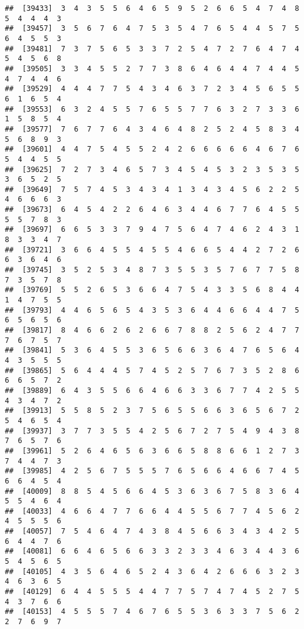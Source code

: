 \documentclass[
]{book}
\begin{document}
\begin{verbatim}
##  [39433]  3  4  3  5  5  6  4  6  5  9  5  2  6  6  5  4  7  4  8  5  4  4  4  3
##  [39457]  3  5  6  7  6  4  7  5  3  5  4  7  6  5  4  4  5  7  5  6  4  5  5  3
##  [39481]  7  3  7  5  6  5  3  3  7  2  5  4  7  2  7  6  4  7  4  5  4  5  6  8
##  [39505]  3  3  4  5  5  2  7  7  3  8  6  4  6  4  4  7  4  4  5  4  7  4  4  6
##  [39529]  4  4  4  7  7  5  4  3  4  6  3  7  2  3  4  5  6  5  5  6  1  6  5  4
##  [39553]  6  3  2  4  5  5  7  6  5  5  7  7  6  3  2  7  3  3  6  1  5  8  5  4
##  [39577]  7  6  7  7  6  4  3  4  6  4  8  2  5  2  4  5  8  3  4  5  6  8  9  3
##  [39601]  4  4  7  5  4  5  5  2  4  2  6  6  6  6  6  4  6  7  6  5  4  4  5  5
##  [39625]  7  2  7  3  4  6  5  7  3  4  5  4  5  3  2  3  5  3  5  3  6  5  2  5
##  [39649]  7  5  7  4  5  3  4  3  4  1  3  4  3  4  5  6  2  2  5  4  6  6  6  3
##  [39673]  6  4  5  4  2  2  6  4  6  3  4  4  6  7  7  6  4  5  5  5  5  7  8  3
##  [39697]  6  6  5  3  3  7  9  4  7  5  6  4  7  4  6  2  4  3  1  8  3  3  4  7
##  [39721]  3  6  6  4  5  5  4  5  5  4  6  6  5  4  4  2  7  2  6  6  3  6  4  6
##  [39745]  3  5  2  5  3  4  8  7  3  5  5  3  5  7  6  7  7  5  8  7  3  5  7  8
##  [39769]  5  5  2  6  5  3  6  6  4  7  5  4  3  3  5  6  8  4  4  1  4  7  5  5
##  [39793]  4  4  6  5  6  5  4  3  5  3  6  4  4  6  6  4  4  7  5  6  5  6  5  6
##  [39817]  8  4  6  6  2  6  2  6  6  7  8  8  2  5  6  2  4  7  7  7  6  7  5  7
##  [39841]  5  3  6  4  5  5  3  6  5  6  6  3  6  4  7  6  5  6  4  4  3  5  5  5
##  [39865]  5  6  4  4  4  5  7  4  5  2  5  7  6  7  3  5  2  8  6  6  6  5  7  2
##  [39889]  6  4  3  5  5  6  6  4  6  6  3  3  6  7  7  4  2  5  5  4  3  4  7  2
##  [39913]  5  5  8  5  2  3  7  5  6  5  5  6  6  3  6  5  6  7  2  5  4  6  5  4
##  [39937]  3  7  7  3  5  5  4  2  5  6  7  2  7  5  4  9  4  3  8  7  6  5  7  6
##  [39961]  5  2  6  4  6  5  6  3  6  6  5  8  8  6  6  1  2  7  3  7  4  4  7  3
##  [39985]  4  2  5  6  7  5  5  5  7  6  5  6  6  4  6  6  7  4  5  6  6  4  5  4
##  [40009]  8  8  5  4  5  6  6  4  5  3  6  3  6  7  5  8  3  6  4  5  5  4  6  4
##  [40033]  4  6  6  4  7  7  6  6  4  4  5  5  6  7  7  4  5  6  2  4  5  5  5  6
##  [40057]  7  5  4  6  4  7  4  3  8  4  5  6  6  3  4  3  4  2  5  6  4  4  7  6
##  [40081]  6  6  4  6  5  6  6  3  3  2  3  3  4  6  3  4  4  3  6  5  4  5  6  5
##  [40105]  4  3  5  6  4  6  5  2  4  3  6  4  2  6  6  6  3  2  3  4  6  3  6  5
##  [40129]  6  4  4  5  5  5  4  4  7  7  5  7  4  7  4  5  2  7  5  4  3  7  6  6
##  [40153]  4  5  5  5  7  4  6  7  6  5  5  3  6  3  3  7  5  6  2  2  7  6  9  7

\end{verbatim}
\end{document}
